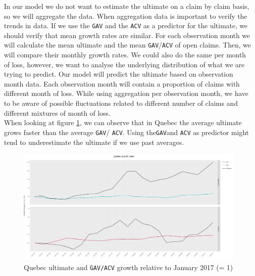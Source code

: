 	In our model we do not want to estimate the ultimate on a claim by claim basis, so we will aggregate the data. When aggregation data is important to verify the trends in data. If we use the \texttt{GAV} and the \texttt{ACV} as a predictor for the ultimate, we should verify that mean growth rates are similar. For each observation month we will calculate the mean ultimate and the mean \texttt{GAV}/\texttt{ACV} of open claims. Then, we will compare their monthly growth rates.  We could also do the same per month of loss, however, we want to analyse the underlying distribution of what we are trying to predict. Our model will predict the ultimate based on observation month data. Each observation month will contain a proportion of claims with different month of loss. While using aggregation per observation month, we have to be aware of possible fluctuations related to different number of claims and different mixtures of month of loss.\\
	When looking at figure \ref{Fig_QC_growth}, we can observe that in Quebec the average ultimate grows faster than the average \texttt{GAV}/ \texttt{ACV}. Using the\texttt{GAV}and \texttt{ACV} as predictor might tend to underestimate the ultimate if we use past averages. 
	
	\begin{figure}[H]
		\begin{center}
			\includegraphics[scale=0.2]{Graphiques/QC_growth} 
			\renewcommand{\figurename}{Figure}
			\caption{Quebec ultimate and \texttt{GAV/ACV} growth relative to January 2017 (= 1)}\label{Fig_QC_growth}
		\end{center}
	\end{figure}

